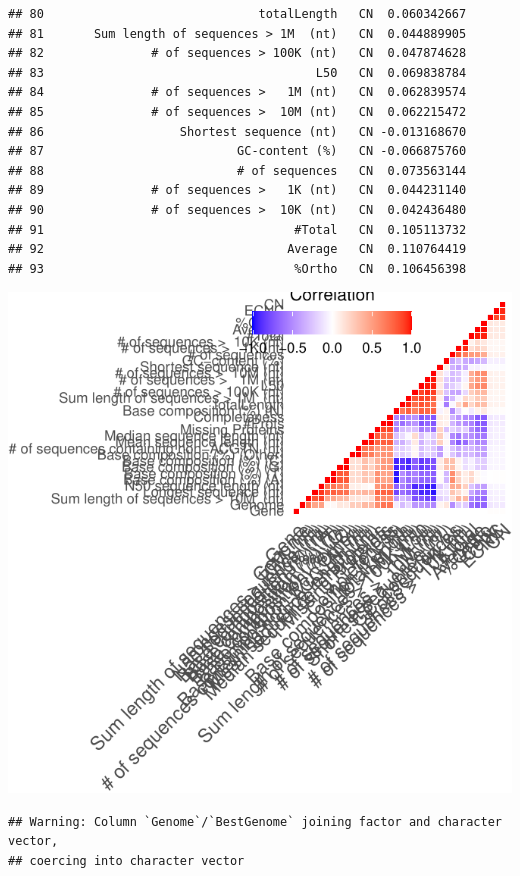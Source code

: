 \documentclass[10pt,letterpaper]{article}
\begin{document}
\begin{verbatim}
## 80                              totalLength   CN  0.060342667
## 81       Sum length of sequences > 1M  (nt)   CN  0.044889905
## 82               # of sequences > 100K (nt)   CN  0.047874628
## 83                                      L50   CN  0.069838784
## 84               # of sequences >   1M (nt)   CN  0.062839574
## 85               # of sequences >  10M (nt)   CN  0.062215472
## 86                   Shortest sequence (nt)   CN -0.013168670
## 87                           GC-content (%)   CN -0.066875760
## 88                           # of sequences   CN  0.073563144
## 89               # of sequences >   1K (nt)   CN  0.044231140
## 90               # of sequences >  10K (nt)   CN  0.042436480
## 91                                   #Total   CN  0.105113732
## 92                                  Average   CN  0.110764419
## 93                                   %Ortho   CN  0.106456398
\end{verbatim}

\includegraphics{paper_PLOS_draft_files/figure-latex/Correlations between genome quality scores-1.pdf}

\begin{verbatim}
## Warning: Column `Genome`/`BestGenome` joining factor and character vector,
## coercing into character vector
\end{verbatim}
\end{document}
